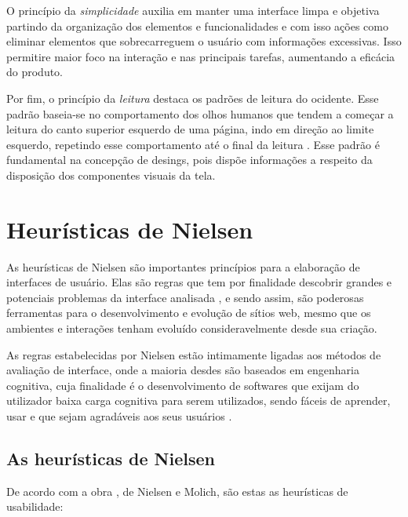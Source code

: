 O princípio da \textit{simplicidade} auxilia em manter uma interface limpa e objetiva partindo da organização dos elementos e funcionalidades e com isso ações como eliminar elementos que sobrecarreguem o usuário com informações excessivas. Isso permitire maior foco na interação e nas principais tarefas, aumentando a eficácia do produto.

Por fim, o princípio da \textit{leitura} destaca os padrões de leitura do ocidente. Esse padrão baseia-se no comportamento dos olhos humanos que tendem a começar a leitura do canto superior esquerdo de uma página, indo em direção ao limite esquerdo, repetindo esse comportamento até o final da leitura \cite{lidwell2010}. Esse padrão é fundamental na concepção de desings, pois dispõe informações a respeito da disposição dos componentes visuais da tela.

\section{Heurísticas de Nielsen}

As heurísticas de Nielsen são importantes princípios para a elaboração de interfaces de usuário. Elas são regras que tem por finalidade descobrir grandes e potenciais problemas da interface analisada \cite{nielsen1994usability}, e sendo assim, são poderosas ferramentas para o desenvolvimento e evolução de sítios web, mesmo que os ambientes e interações tenham evoluído consideravelmente desde sua criação.

As regras estabelecidas por Nielsen estão intimamente ligadas aos métodos de avaliação de interface, onde a maioria desdes são baseados em engenharia cognitiva, cuja finalidade é o desenvolvimento de softwares que exijam do utilizador baixa carga cognitiva para serem utilizados, sendo fáceis de aprender, usar e que sejam agradáveis aos seus usuários \cite{maciel2004avaliacao}.

\subsection{As heurísticas de Nielsen}

De acordo com a obra \cite{nielsen1994usability}, de Nielsen e Molich, são estas as heurísticas de usabilidade:

